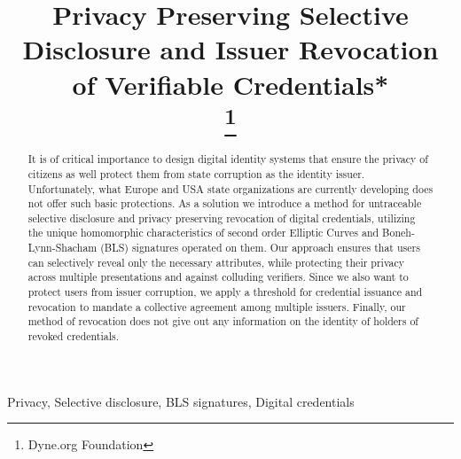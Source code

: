 \documentclass[conference]{IEEEtran}
\begin{document}
\title{Privacy Preserving Selective Disclosure and Issuer Revocation of Verifiable Credentials*\\
\thanks{Dyne.org Foundation}
}

\author{
\and
{}
}

\maketitle

\begin{abstract}

It is of critical importance to design digital identity systems that
ensure the privacy of citizens as well protect them from state
corruption as the identity issuer. Unfortunately, what Europe and USA
state organizations are currently developing does not offer such basic
protections. As a solution we introduce a method for untraceable
selective disclosure and privacy preserving revocation of digital
credentials, utilizing the unique homomorphic characteristics of
second order Elliptic Curves and Boneh-Lynn-Shacham (BLS) signatures
operated on them. Our approach ensures that users can selectively
reveal only the necessary attributes, while protecting their privacy
across multiple presentations and against colluding verifiers. Since
we also want to protect users from issuer corruption, we apply a
threshold for credential issuance and revocation to mandate a
collective agreement among multiple issuers. Finally, our method of
revocation does not give out any information on the identity of
holders of revoked credentials.

\end{abstract}

\begin{IEEEkeywords}
Privacy, Selective disclosure, BLS signatures, Digital credentials
\end{IEEEkeywords}
\end{document}
